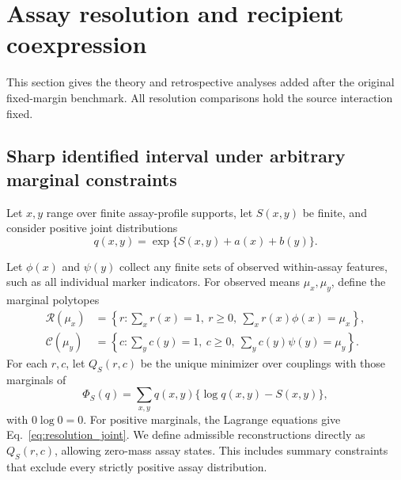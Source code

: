 \section{Assay resolution and recipient coexpression}
\label{sec:resolution}
This section gives the theory and retrospective analyses added after the
original fixed-margin benchmark. All resolution comparisons hold the source
interaction fixed.

\subsection{Sharp identified interval under arbitrary marginal constraints}\label{app:proof}
Let $x,y$ range over finite assay-profile supports, let $S(x,y)$ be finite,
and consider positive joint distributions
\begin{equation}
 q(x,y)=\exp\{S(x,y)+a(x)+b(y)\}.
 \label{eq:resolution_joint}
\end{equation}

Let $\phi(x)$ and $\psi(y)$ collect any finite sets of observed within-assay
features, such as all individual marker indicators. For observed means
$\mu_x,\mu_y$, define the marginal polytopes
\begin{align*}
 \mathcal R(\mu_x)&=\left\{r:\sum_xr(x)=1,
   \ r\geq0,\ \sum_xr(x)\phi(x)=\mu_x\right\},\\
 \mathcal C(\mu_y)&=\left\{c:\sum_yc(y)=1,
   \ c\geq0,\ \sum_yc(y)\psi(y)=\mu_y\right\}.
\end{align*}
For each $r,c$, let $Q_S(r,c)$ be the unique minimizer over couplings with
those marginals of
\begin{equation}
 \Phi_S(q)=\sum_{x,y}q(x,y)\{\log q(x,y)-S(x,y)\},
 \label{eq:information-projection}
\end{equation}
with $0\log0=0$. For positive marginals, the Lagrange equations give
Eq.~\eqref{eq:resolution_joint}. We define admissible reconstructions directly
as $Q_S(r,c)$, allowing zero-mass assay states. This includes summary
constraints that exclude every strictly positive assay distribution.

